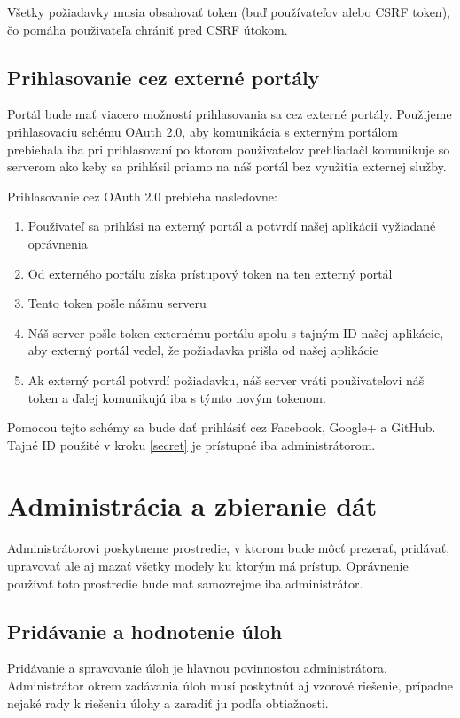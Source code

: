 Všetky požiadavky musia obsahovať token (buď používateľov alebo CSRF token),
čo pomáha použivateľa chrániť pred CSRF útokom.

\subsection{Prihlasovanie cez externé portály}
\label{oAuth}
Portál bude mať viacero možností prihlasovania sa cez externé portály.
Použijeme prihlasovaciu schému OAuth 2.0, aby komunikácia s externým
portálom prebiehala iba pri prihlasovaní po ktorom použivateľov prehliadačl
komunikuje so serverom ako keby sa prihlásil priamo na náš portál bez využitia externej služby.

Prihlasovanie cez OAuth 2.0 prebieha nasledovne:
\begin{enumerate}
\item{Použivateľ sa prihlási na externý portál a potvrdí našej aplikácii vyžiadané oprávnenia}
\item{Od externého portálu získa prístupový token na ten externý portál}
\item \label{secret}{Tento token pošle nášmu serveru}
\item{Náš server pošle token externému portálu spolu s tajným ID našej aplikácie, aby externý portál vedel, že požiadavka prišla od našej aplikácie}
\item{Ak externý portál potvrdí požiadavku, náš server vráti použivateľovi náš token a ďalej komunikujú iba s týmto novým tokenom.}
\end{enumerate}

Pomocou tejto schémy sa bude dať prihlásiť cez Facebook, Google+ a GitHub.
\newline
Tajné ID použité v kroku \ref{secret} je prístupné iba administrátorom.

\section{Administrácia a zbieranie dát}
Administrátorovi poskytneme prostredie, v ktorom bude môcť prezerať, pridávať,
upravovať ale aj mazať všetky modely ku ktorým má prístup. Oprávnenie
používať toto prostredie bude mať samozrejme iba administrátor.
\subsection{Pridávanie a hodnotenie úloh}
Pridávanie a spravovanie úloh je hlavnou povinnosťou administrátora. Administrátor
okrem zadávania úloh musí poskytnúť aj vzorové riešenie, prípadne nejaké rady k
riešeniu úlohy a zaradiť ju podľa obtiažnosti.

